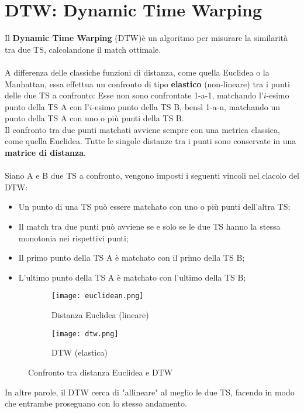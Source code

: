\section{DTW: Dynamic Time Warping}
Il \textbf{Dynamic Time Warping} (DTW)\cite{dtw}è un algoritmo per misurare la similarità tra due TS, calcolandone il match ottimale.\\
\\
A differenza delle classiche funzioni di distanza, come quella Euclidea o la Manhattan, essa effettua un confronto di tipo \textbf{elastico} (non-lineare) tra i punti delle due TS a confronto: Esse non sono confrontate 1-a-1, matchando l'$i$-esimo punto della TS A con l'$i$-esimo punto della TS B, bensì 1-a-n, matchando un punto della TS A con uno o più punti della TS B.\\
Il confronto tra due punti matchati avviene sempre con una metrica classica, come quella Euclidea. Tutte le singole distanze tra i punti sono conservate in una \textbf{matrice di distanza}.\\
\\
Siano A e B due TS a confronto, vengono imposti i seguenti vincoli nel clacolo del DTW:
\begin{itemize}
	\item Un punto di una TS può essere matchato con uno o più punti dell'altra TS;
	\item Il match tra due punti può avviene se e solo se le due TS hanno la stessa monotonia nei rispettivi punti;
	\item Il primo punto della TS A è matchato con il primo della TS B;
	\item L'ultimo punto della TS A è matchato con l'ultimo della TS B; 
\end{itemize}
\begin{figure}[H]
	\centering
	\begin{subfigure}{.5\textwidth}
		\centering
		\texttt{[image: euclidean.png]}
		\caption{Distanza Euclidea (lineare)}
		\label{fig:distance_euclidean}
	\end{subfigure}%
	\begin{subfigure}{.5\textwidth}
		\centering
		\texttt{[image: dtw.png]}
		\caption{DTW (elastica)}
		\label{fig:distance_dtw}
	\end{subfigure}
	\caption{Confronto tra distanza Euclidea e DTW}
	\label{fig:distance}
\end{figure}
In altre parole, il DTW cerca di "allineare" al meglio le due TS, facendo in modo che entrambe proseguano con lo stesso andamento.\\
